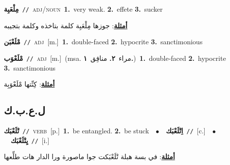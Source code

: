 \documentclass[10pt,a4paper,twoside]{article} %
\begin{document}
\begin{multicols}{2}
{\setlength\topsep{0pt}\textbf{\foreignlanguage{arabic}{مِلْعَبِة}}\ {\color{gray}\texttt{//}\color{black}}\ \textsc{adj/noun}\ \textbf{1.}~very weak.  \textbf{2.}~effete  \textbf{3.}~sucker\  \begin{flushright}\color{gray}\foreignlanguage{arabic}{\textbf{\underline{\foreignlanguage{arabic}{أمثلة}}}: جوزها مِلْعَبِة كلمة بتاخذه وكلمة بتجيبه}\end{flushright}\color{black}} \vspace{2mm}

{\setlength\topsep{0pt}\textbf{\foreignlanguage{arabic}{مْلَعْبَن}}\ {\color{gray}\texttt{//}\color{black}}\ \textsc{adj}\ [m.]\ \textbf{1.}~double-faced  \textbf{2.}~hypocrite  \textbf{3.}~sanctimonious\ } \vspace{2mm}

{\setlength\topsep{0pt}\textbf{\foreignlanguage{arabic}{مْلَعْوَب}}\ {\color{gray}\texttt{//}\color{black}}\ \textsc{adj}\ [m.]\ \color{gray}(msa. \foreignlanguage{arabic}{مراء}~\foreignlanguage{arabic}{\textbf{٢.}}  \foreignlanguage{arabic}{منافِق}~\foreignlanguage{arabic}{\textbf{١.}})\color{black}\ \textbf{1.}~double-faced  \textbf{2.}~hypocrite  \textbf{3.}~sanctimonious\  \begin{flushright}\color{gray}\foreignlanguage{arabic}{\textbf{\underline{\foreignlanguage{arabic}{أمثلة}}}: كِنِّتها مْلَعْوَبِة}\end{flushright}\color{black}} \vspace{2mm}

\vspace{-3mm}
\subsection*{\color{blue}\foreignlanguage{arabic}{ل.ع.ب.ك}\color{blue}{}} 

{\setlength\topsep{0pt}\textbf{\foreignlanguage{arabic}{تْلَعْبَك}}\ {\color{gray}\texttt{//}\color{black}}\ \textsc{verb}\ [p.]\ \textbf{1.}~be entangled.  \textbf{2.}~be stuck\ \ $\bullet$\ \ \setlength\topsep{0pt}\textbf{\foreignlanguage{arabic}{اِتْلَعْبَك}}\ {\color{gray}\texttt{//}\color{black}}\ [c.]\ \ $\bullet$\ \ \setlength\topsep{0pt}\textbf{\foreignlanguage{arabic}{يِتْلَعْبَك}}\ {\color{gray}\texttt{//}\color{black}}\ [i.]\  \begin{flushright}\color{gray}\foreignlanguage{arabic}{\textbf{\underline{\foreignlanguage{arabic}{أمثلة}}}: في بسة هبلة تْلَعْبَكت جوا ماصورة ورا الدار هات طلِّعها}\end{flushright}\color{black}} \vspace{2mm}


\end{multicols}
\end{document}

